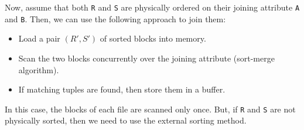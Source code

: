 \documentclass[a4paper, openany]{memoir}
\theoremstyle{definition}
\theoremstyle{plain}
\begin{document}
Now, assume that both \texttt{R} and \texttt{S} are physically ordered on their joining attribute \texttt{A} and \texttt{B}. Then, we can use the following approach to join them:
\begin{itemize}
    \item Load a pair $(R', S')$ of sorted blocks into memory.
    \item Scan the two blocks concurrently over the joining attribute (sort-merge algorithm).
    \item If matching tuples are found, then store them in a buffer.
\end{itemize}
In this case, the blocks of each file are scanned only once. But, if \texttt{R} and \texttt{S} are not physically sorted, then we need to use the external sorting method.


\end{document}

